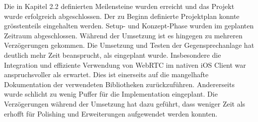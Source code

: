 Die in Kapitel 2.2 definierten Meilensteine wurden erreicht und das Projekt wurde erfolgreich abgeschlossen.
Der zu Beginn definierte Projektplan konnte grösstenteils eingehalten werden.
Setup- und Konzept-Phase wurden im geplanten Zeitraum abgeschlossen.
Während der Umsetzung ist es hingegen zu mehreren Verzögerungen gekommen.
Die Umsetzung und Testen der Gegensprechanlage hat deutlich mehr Zeit beansprucht, als eingeplant wurde.
Insbesondere die Integration und effiziente Verwendung von WebRTC im nativen iOS Client war anspruchsvoller als erwartet.
Dies ist einerseits auf die mangelhafte Dokumentation der verwendeten Bibliotheken zurückzuführen.
Andererseits wurde schlicht zu wenig Puffer für die Implementation eingeplant.
Die Verzögerungen während der Umsetzung hat dazu geführt, dass weniger Zeit als erhofft für Polishing und Erweiterungen aufgewendet werden konnten.


\clearpage
